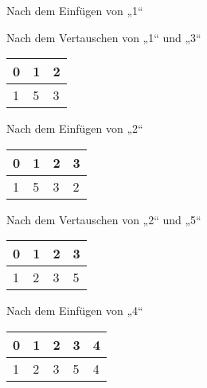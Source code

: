\documentclass{bschlangaul-aufgabe}
\begin{document}
\begin{enumerate}
\begin{enumerate}
\begin{bAntwort}
\begin{bBaum}{Nach dem Einfügen von „1“}
\end{bBaum}

\begin{bBaum}{Nach dem Vertauschen von „1“ und „3“}
\begin{tabular}{lll}
\bf{0} & \bf{1} & \bf{2} \\
\hline
1      & 5      & 3      \\
\end{tabular}

\end{bBaum}

\begin{bBaum}{Nach dem Einfügen von „2“}
\begin{tabular}{llll}
\bf{0} & \bf{1} & \bf{2} & \bf{3} \\
\hline
1      & 5      & 3      & 2      \\
\end{tabular}

\end{bBaum}

\begin{bBaum}{Nach dem Vertauschen von „2“ und „5“}
\begin{tabular}{llll}
\bf{0} & \bf{1} & \bf{2} & \bf{3} \\
\hline
1      & 2      & 3      & 5      \\
\end{tabular}

\end{bBaum}

\begin{bBaum}{Nach dem Einfügen von „4“}
\begin{tabular}{lllll}
\bf{0} & \bf{1} & \bf{2} & \bf{3} & \bf{4} \\
\hline
1      & 2      & 3      & 5      & 4      \\
\end{tabular}


\end{bBaum}
\end{bAntwort}
\end{enumerate}
\end{enumerate}
\end{document}
